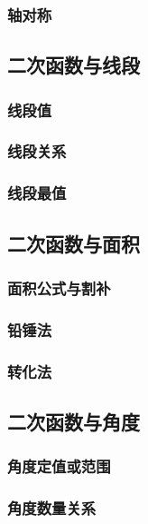 \documentclass[lang=cn, 10pt, titlestyle=display, oneside, toc=twocol]{elegantbook}
\begin{document}
\subsubsection*{轴对称}
\subsection{二次函数与\textbf{线段}}

\subsubsection*{线段值}

\subsubsection*{线段关系}

\subsubsection*{线段最值}

\subsection{二次函数与\textbf{面积}}

\subsubsection*{面积公式与割补}

\subsubsection*{铅锤法}

\subsubsection*{转化法}

\subsection{二次函数与\textbf{角度}}

\subsubsection*{角度定值或范围}

\subsubsection*{角度数量关系}
\end{document}
